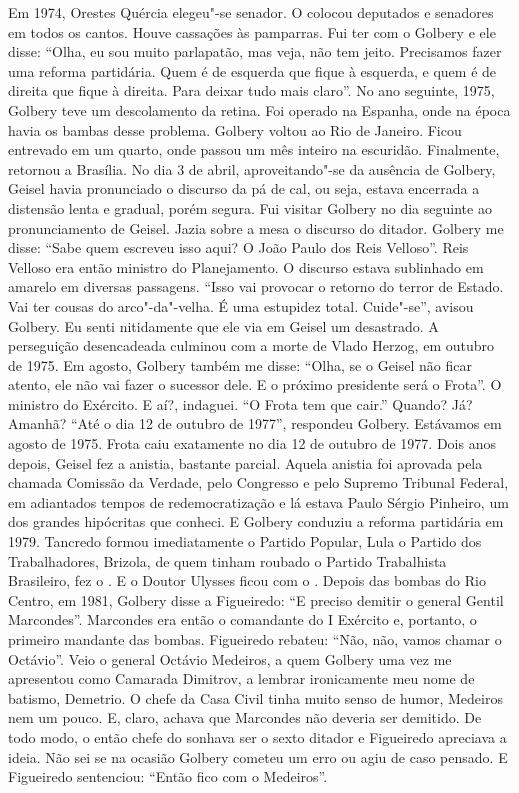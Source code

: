 \normalfont
Em 1974, Orestes Quércia elegeu"-se senador. O  colocou
deputados e senadores em todos os cantos. Houve cassações às pamparras.
Fui ter com o Golbery e ele disse: ``Olha, eu sou muito parlapatão, mas
veja, não tem jeito. Precisamos fazer uma reforma partidária. Quem é de
esquerda que fique à esquerda, e quem é de direita que fique à direita.
Para deixar tudo mais claro''. No ano seguinte, 1975, Golbery teve um
descolamento da retina. Foi operado na Espanha, onde na época havia os
bambas desse problema. Golbery voltou ao Rio de Janeiro. Ficou entrevado
em um quarto, onde passou um mês inteiro na escuridão. Finalmente,
retornou a Brasília. No dia 3 de abril, aproveitando"-se da ausência de
Golbery, Geisel havia pronunciado o discurso da pá de cal, ou seja,
estava encerrada a distensão lenta e gradual, porém segura. Fui visitar
Golbery no dia seguinte ao pronunciamento de Geisel. Jazia sobre a mesa
o discurso do ditador. Golbery me disse: ``Sabe quem escreveu isso aqui?
O João Paulo dos Reis Velloso''. Reis Velloso era então ministro do
Planejamento. O discurso estava sublinhado em amarelo em diversas
passagens. ``Isso vai provocar o retorno do terror de Estado. Vai ter
cousas do arco"-da"-velha. É uma estupidez total. Cuide"-se'', avisou
Golbery. Eu senti nitidamente que ele via em Geisel um desastrado. A
perseguição desencadeada culminou com a morte de Vlado Herzog, em
outubro de 1975. Em agosto, Golbery também me disse: ``Olha, se o Geisel
não ficar atento, ele não vai fazer o sucessor dele. E o próximo
presidente será o Frota''. O ministro do Exército. E aí?, indaguei. ``O
Frota tem que cair.'' Quando? Já? Amanhã? ``Até o dia 12 de outubro de
1977'', respondeu Golbery. Estávamos em agosto de 1975. Frota caiu
exatamente no dia 12 de outubro de 1977. Dois anos depois, Geisel fez a
anistia, bastante parcial. Aquela anistia foi aprovada pela chamada
Comissão da Verdade, pelo Congresso e pelo Supremo Tribunal Federal, em
adiantados tempos de redemocratização e lá estava Paulo Sérgio Pinheiro,
um dos grandes hipócritas que conheci. E Golbery conduziu a reforma
partidária em 1979. Tancredo formou imediatamente o Partido Popular,
Lula o Partido dos Trabalhadores, Brizola, de quem tinham roubado o
Partido Trabalhista Brasileiro, fez o . E o Doutor Ulysses ficou com
o . Depois das bombas do Rio Centro, em 1981, Golbery disse a
Figueiredo: ``E preciso demitir o general Gentil Marcondes''. Marcondes
era então o comandante do I Exército e, portanto, o primeiro mandante
das bombas. Figueiredo rebateu: ``Não, não, vamos chamar o Octávio''.
Veio o general Octávio Medeiros, a quem Golbery uma vez me apresentou
como Camarada Dimitrov, a lembrar ironicamente meu nome de batismo,
Demetrio. O chefe da Casa Civil tinha muito senso de humor, Medeiros nem
um pouco. E, claro, achava que Marcondes não deveria ser demitido. De
todo modo, o então chefe do  sonhava ser o sexto ditador e Figueiredo
apreciava a ideia. Não sei se na ocasião Golbery cometeu um erro ou agiu
de caso pensado. E Figueiredo sentenciou: ``Então fico com o Medeiros''.

